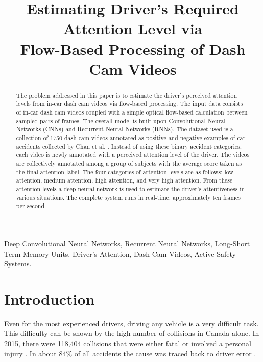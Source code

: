\documentclass[10pt, conference, compsocconf]{IEEEtran}
\begin{document}
\title{Estimating Driver's Required Attention Level via \\Flow-Based Processing of Dash Cam Videos}
\author{
}

\maketitle

\begin{abstract}
The problem addressed in this paper is to estimate the driver's perceived attention levels from in-car dash cam videos via flow-based processing. The input data consists of in-car dash cam videos coupled with a simple optical flow-based calculation between sampled pairs of frames. The overall model is built upon Convolutional Neural Networks (CNNs) and Recurrent Neural Networks (RNNs). The dataset used is a collection of 1750 dash cam videos annotated as positive and negative examples of car accidents collected by Chan et al. \cite{10.1007/978-3-319-54190-7_9}. Instead of using these binary accident categories, each video is newly annotated with a perceived attention level of the driver. The videos are collectively annotated among a group of subjects with the average score taken as the final attention label. The four categories of attention levels are as follows: low attention, medium attention, high attention, and very high attention. From these attention levels a deep neural network is used to estimate the driver's attentiveness in various situations. The complete system runs in real-time; approximately ten frames per second.
\end{abstract}

\begin{IEEEkeywords}
Deep Convolutional Neural Networks, Recurrent Neural Networks, Long-Short Term Memory Units, Driver's Attention, Dash Cam Videos, Active Safety Systems.
\end{IEEEkeywords}

\IEEEpeerreviewmaketitle

\section{Introduction}
Even for the most experienced drivers, driving any vehicle is a very difficult task. This difficulty can be shown by the high number of collisions in Canada alone. In 2015, there were 118,404 collisions that were either fatal or involved a personal injury \cite{TrafficReport}. In about 84\% of all accidents the cause was traced back to driver error \cite{CognitiveModel}. 
\end{document}
